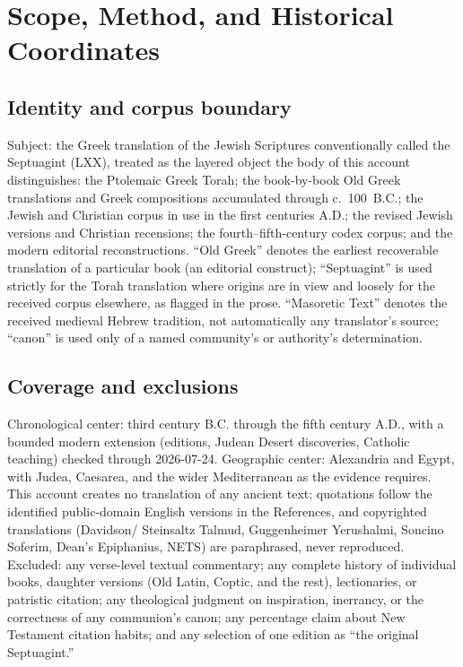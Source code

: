 \section{Scope, Method, and Historical Coordinates}

\subsection{Identity and corpus boundary}

Subject: the Greek translation of the Jewish Scriptures conventionally
called the Septuagint (LXX), treated as the layered object the body of
this account distinguishes: the Ptolemaic Greek Torah; the book-by-book
Old Greek translations and Greek compositions accumulated through
c.~100~B.C.; the Jewish and Christian corpus in use in the first
centuries A.D.; the revised Jewish versions and Christian recensions; the
fourth--fifth-century codex corpus; and the modern editorial
reconstructions. ``Old Greek'' denotes the earliest recoverable
translation of a particular book (an editorial construct);
``Septuagint'' is used strictly for the Torah translation where origins
are in view and loosely for the received corpus elsewhere, as flagged in
the prose. ``Masoretic Text'' denotes the received medieval Hebrew
tradition, not automatically any translator's source; ``canon'' is used
only of a named community's or authority's determination.

\subsection{Coverage and exclusions}

Chronological center: third century B.C. through the fifth century A.D.,
with a bounded modern extension (editions, Judean Desert discoveries,
Catholic teaching) checked through 2026-07-24. Geographic center:
Alexandria and Egypt, with Judea, Caesarea, and the wider Mediterranean
as the evidence requires. This account creates no translation of any
ancient text; quotations follow the identified public-domain English
versions in the References, and copyrighted translations (Davidson/
Steinsaltz Talmud, Guggenheimer Yerushalmi, Soncino Soferim, Dean's
Epiphanius, NETS) are paraphrased, never reproduced. Excluded: any
verse-level textual commentary; any complete history of individual books,
daughter versions (Old Latin, Coptic, and the rest), lectionaries, or
patristic citation; any theological judgment on inspiration, inerrancy,
or the correctness of any communion's canon; any percentage claim about
New Testament citation habits; and any selection of one edition as ``the
original Septuagint.''

